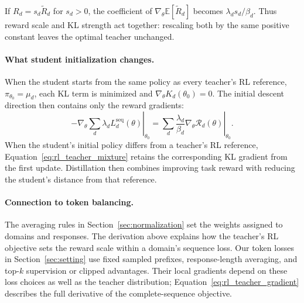 If $R_d=s_d\widetilde R_d$ for $s_d>0$, the coefficient of
$\nabla_\theta\mathbb E[\widetilde R_d]$ becomes
$\lambda_d s_d/\beta_d$. Thus reward scale and KL strength act together:
rescaling both by the same positive constant leaves the optimal
teacher unchanged.

\paragraph{What student initialization changes.}
When the student starts from the same policy as every teacher's RL
reference, $\pi_{\theta_0}=\mu_d$, each KL term is minimized and
$\nabla_\theta K_d(\theta_0)=0$. The initial descent direction then
contains only the reward gradients:
\begin{equation}
\left.-\nabla_\theta\sum_d\lambda_d L_d^{\mathrm{seq}}(\theta)
\right|_{\theta_0}
=\left.\sum_d\frac{\lambda_d}{\beta_d}
  \nabla_\theta\mathcal R_d(\theta)\right|_{\theta_0}.
\label{eq:rl_teacher_initial_gradient}
\end{equation}
When the student's initial policy differs from a teacher's RL
reference, Equation~\ref{eq:rl_teacher_mixture} retains the corresponding
KL gradient from the first update. Distillation then combines improving
task reward with reducing the student's distance from that reference.

\paragraph{Connection to token balancing.}
The averaging rules in Section~\ref{sec:normalization} set the weights
assigned to domains and responses. The derivation above explains how
the teacher's RL objective sets the reward scale within a domain's
sequence loss. Our token losses in Section~\ref{sec:setting} use fixed
sampled prefixes, response-length averaging, and top-$k$ supervision
or clipped advantages. Their local gradients depend on these loss
choices as well as the teacher distribution; Equation~\ref{eq:rl_teacher_gradient}
describes the full derivative of the complete-sequence objective.
